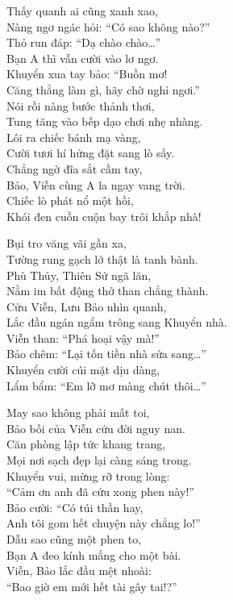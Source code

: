 \documentclass[../main.tex]{subfiles}
\begin{document}
\begin{center}
    Thấy quanh ai cũng xanh xao,\\
    Nàng ngơ ngác hỏi: ``Có sao không nào?''\\
    Thỏ run đáp: ``Dạ chào chào\dots''\\
    Bạn A thì vẫn cười vào lơ ngơ.\\
    Khuyển xua tay bảo: ``Buồn mơ!\\
    Căng thẳng làm gì, hãy chờ nghỉ ngơi.''\\
    Nói rồi nàng bước thảnh thơi,\\
    Tung tăng vào bếp dạo chơi nhẹ nhàng.\\
    Lôi ra chiếc bánh mạ vàng,\\
    Cười tươi hí hửng đặt sang lò sấy.\\
    Chẳng ngờ đĩa sắt cầm tay,\\
    Bảo, Viễn cùng A la ngay vang trời.\\
    Chiếc lò phát nổ một hồi,\\
    Khói đen cuồn cuộn bay trôi khắp nhà!

    Bụi tro văng vãi gần xa,\\
    Tường rung gạch lở thật là tanh bành.\\
    Phù Thủy, Thiên Sứ ngã lăn,\\
    Nằm im bất động thở than chẳng thành.\\
    Cửu Viễn, Lưu Bảo nhìn quanh,\\
    Lắc đầu ngán ngẩm trông sang Khuyển nhà.\\
    Viễn than: ``Phá hoại vậy mà!''\\
    Bảo chêm: ``Lại tốn tiền nhà sửa sang\dots''\\
    Khuyển cười cúi mặt dịu dàng,\\
    Lẩm bẩm: ``Em lỡ mơ màng chút thôi\dots''


    May sao không phải mất toi,\\
    Bảo bối của Viễn cứu đời nguy nan.\\
    Căn phòng lập tức khang trang,\\
    Mọi nơi sạch đẹp lại càng sáng trong.\\
    Khuyển vui, mừng rỡ trong lòng:\\
    ``Cảm ơn anh đã cứu xong phen này!''\\
    Bảo cười: ``Có túi thần hay,\\
    Anh tôi gom hết chuyện này chẳng lo!''\\
    Dẫu sao cũng một phen to,\\
    Bạn A đeo kính mắng cho một bài.\\
    Viễn, Bảo lắc đầu mệt nhoài:\\
    ``Bao giờ em mới hết tài gây tai!?''


\end{center}
\end{document}
